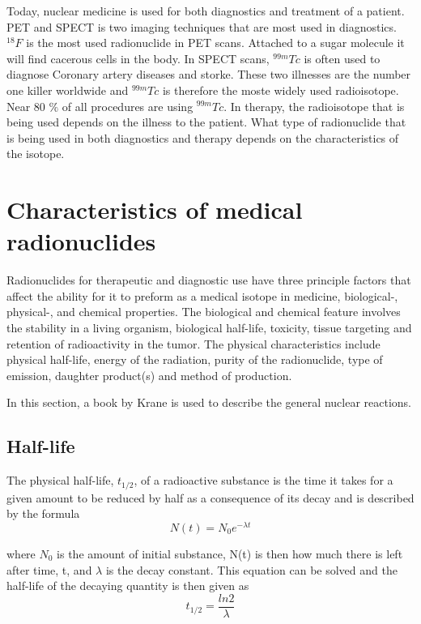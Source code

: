 \documentclass[twoside,english]{uiofysmaster/uiofysmaster}
\begin{document}
Today, nuclear medicine is used for both diagnostics and treatment of a patient. PET and SPECT is two imaging techniques that are most used in diagnostics. $^{18}F$ is the most used radionuclide in PET scans. Attached to a sugar molecule it will find cacerous cells in the body. In SPECT scans, $^{99m}Tc$ is often used to diagnose Coronary artery diseases and storke. These two illnesses are the number one killer worldwide and $^{99m}Tc$ is therefore the moste widely used radioisotope. Near 80 $\%$ of all procedures are using $^{99m}Tc$. In therapy, the radioisotope that is being used depends on the illness to the patient. What type of radionuclide that is being used in both diagnostics and therapy depends on the characteristics of the isotope.   



\section{Characteristics of medical radionuclides}
\noindent

Radionuclides for therapeutic and diagnostic use have three principle factors that affect the ability for it to preform as a medical isotope in medicine\cite{invivo}, biological-, physical-, and chemical properties.
The biological and chemical feature involves the stability in a living organism, biological half-life, toxicity, tissue targeting and retention of radioactivity in the tumor\cite{Yeong}.
The physical characteristics include physical half-life, energy of the radiation, purity of the radionuclide, type of emission, daughter product(s) and method of production\cite{Yeong}. 

In this section, a book by Krane\cite{Krane} is used to describe the general nuclear reactions.



\subsection{Half-life}
The physical half-life, $t_{1/2}$, of a radioactive substance is the time it takes for a given amount to be reduced by half as a consequence of its decay and is described by the formula 
\begin{equation}
N(t) = N_0e^{-\lambda t} 
\end{equation}
 
where $N_0$ is the amount of initial substance, N(t) is then how much there is left after time, t, and $\lambda$ is the decay constant. This equation can be solved and the half-life of the decaying quantity is then given as
\begin{equation}
 t_{1/2} = \frac{ln2}{\lambda} 
\end{equation}
\end{document}
